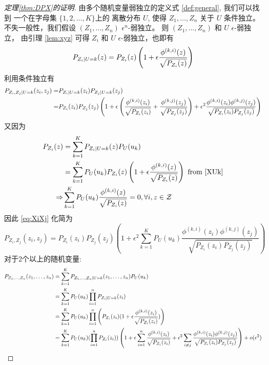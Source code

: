 \begin{proof}[定理\ref{thm:DPX}的证明]
  由多个随机变量弱独立的定义式 \ref{def:general},
  我们可以找到 一个在字母集 $\{1, 2,\dots, K\}$上的
  离散分布 $U$, 使得 $Z_1, \dots, Z_n$
  关于 $U$ 条件独立。不失一般性，我们假设
  $(Z_1, \dots, Z_n)$ $\epsilon^n$-弱独立。
  则 $(Z_1, \dots, Z_n)$ 和 $U$ $\epsilon$-弱独立，
  由引理 \ref{lem:xyz} 可得 $Z_i$
  和 $U$ $\epsilon$-弱独立，也即有 
\begin{equation}\label{XUk}
P_{Z_i | U=k}(z) = P_{Z_i} (z) \left( 1 + \epsilon {\phi^{(k,i)}(z) \over \sqrt{P_{Z_i}(z)}} \right)
\end{equation}
利用条件独立有
\begin{align}
P_{Z_i, Z_j | U = k}(z_i, z_j)
=& P_{Z_i | U=k}(z_i)
P_{Z_j | U=k}(z_j) \notag \\
=& P_{Z_i}(z_i)P_{Z_j}(z_j)
\left(1 + \epsilon
\left(\frac{\phi^{(k,i)}(z_i)}{\sqrt{P_{Z_i}(z_i)}}
+ \frac{\phi^{(k,j)}(z_j)}{\sqrt{P_{Z_j}(z_j)}}
\right) +
\epsilon^2\frac{\phi^{(k,i)}(z_i)
	\phi^{(k,j)}(z_j)}{\sqrt{P_{Z_i}(z_i)P_{Z_j}(z_j)}}
  \right)
  \label{eq:XiXj}
\end{align}
又因为
\begin{align*}
P_{Z_i}(z) &= \sum_{k=1}^{K} P_{Z_i | U=k}(z) P_U(u_k) \\
& =  \sum_{k=1}^{K}P_U(u_k)P_{Z_i} (z)
\left( 1 + \epsilon {\phi^{(k,i)}(z) \over \sqrt{P_{Z_i}(z)}} 
\right) \textrm{ from } \eqref{XUk}\\
\Rightarrow & \sum_{k=1}^{K} P_U(u_k){\phi^{(k, i)}(z) \over \sqrt{P_{Z_i}(z)}} =0,\forall i, z\in \mathcal{Z}
\end{align*}
因此 \eqref{eq:XiXj} 化简为
\begin{equation}\label{eq:PXiXj}
P_{Z_i, Z_j}(z_i, z_j) = P_{Z_i}(z_i)
P_{Z_j}(z_j) \left(
  1+\epsilon^2 \sum_{k=1}^K P_U(u_k)
\frac{\phi^{(k,i)}(z_i)
	\phi^{(k,j)}(z_j)}{\sqrt{P_{Z_i}(z_i)P_{Z_j}(z_j)}}
  \right)
\end{equation}
对于2个以上的随机变量:
\begin{align*}
P_{Z_1,\dots,Z_n}(z_1,\dots,z_n)  &= \sum_{k=1}^{K} P_{Z_1,\dots,Z_n | U=k}(z_1,\dots,z_n) P_U(u_k) \\
&=  \sum_{k=1}^{K}P_U(u_k) \prod_{i=1}^n P_{Z_i|U=k}(z_i)\\
&= \sum_{k=1}^{K} P_U(u_k)\prod_{i=1}^n \left(P_{Z_i} (z_i)( 1 + \epsilon {\phi^{(k,i)}(z_i ) \over \sqrt{P_{Z_i}(z_i)}} )\right)\\
&=  \sum_{k=1}^{K}P_U(u_k) (\prod_{i=1}^n  P_{Z_i} (z_i))
\left( 1 + \epsilon\sum_{i=1}^n {\phi^{(k,i)}(z_i) \over \sqrt{P_{Z_i}(z_i)}} + \epsilon^2\sum_{i\neq j}{\phi^{(k,i)}(z_i)\phi^{(k,j)}(z_j)\over \sqrt{P_{Z_i}(z_i)P_{Z_j}(z_j)} }\right)+o(\epsilon^2) \\

\end{align*}
\end{proof}
